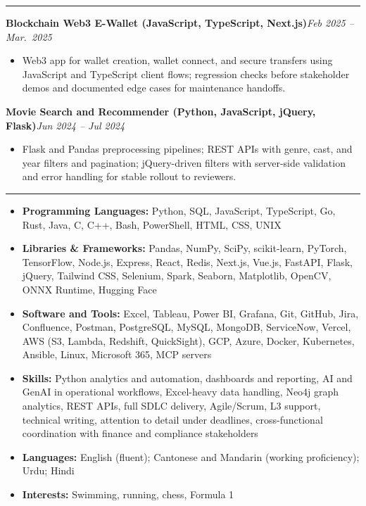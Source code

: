 \documentclass[9pt,a4paper]{article}
\newcommand{\ressection}[1]{%
  \vspace{0.8em}%
  \noindent{\large\scshape\bfseries #1}\par\nobreak
  \vspace{-\parskip}%
  \noindent\rule{\linewidth}{0.1pt}\par\nobreak
  \vspace{-\parskip}%
}
\newcommand{\resumeHeading}[2]{%
  \vspace{0.6em}%
  \noindent\textbf{\small #1}\hfill\textit{\small #2}\par\vspace{0.28em}}
\begin{document}
\ressection{Projects}

\resumeHeading{Blockchain Web3 E-Wallet (JavaScript, TypeScript, Next.js)}{Feb 2025 -- Mar.\ 2025}
\begin{itemize}
  \item Web3 app for wallet creation, wallet connect, and secure transfers using JavaScript and TypeScript client flows; regression checks before stakeholder demos and documented edge cases for maintenance handoffs.
\end{itemize}

\resumeHeading{Movie Search and Recommender (Python, JavaScript, jQuery, Flask)}{Jun 2024 -- Jul 2024}
\begin{itemize}
  \item Flask and Pandas preprocessing pipelines; REST APIs with genre, cast, and year filters and pagination; jQuery-driven filters with server-side validation and error handling for stable rollout to reviewers.
\end{itemize}

\ressection{Skills and Interests}
\begin{itemize}
  \item \textbf{Programming Languages:} Python, SQL, JavaScript, TypeScript, Go, Rust, Java, C, C++, Bash, PowerShell, HTML, CSS, UNIX
  \item \textbf{Libraries \& Frameworks:} Pandas, NumPy, SciPy, scikit-learn, PyTorch, TensorFlow, Node.js, Express, React, Redis, Next.js, Vue.js, FastAPI, Flask, jQuery, Tailwind CSS, Selenium, Spark, Seaborn, Matplotlib, OpenCV, ONNX Runtime, Hugging Face
  \item \textbf{Software and Tools:} Excel, Tableau, Power BI, Grafana, Git, GitHub, Jira, Confluence, Postman, PostgreSQL, MySQL, MongoDB, ServiceNow, Vercel, AWS (S3, Lambda, Redshift, QuickSight), GCP, Azure, Docker, Kubernetes, Ansible, Linux, Microsoft 365, MCP servers
  \item \textbf{Skills:} Python analytics and automation, dashboards and reporting, AI and GenAI in operational workflows, Excel-heavy data handling, Neo4j graph analytics, REST APIs, full SDLC delivery, Agile/Scrum, L3 support, technical writing, attention to detail under deadlines, cross-functional coordination with finance and compliance stakeholders
  \item \textbf{Languages:} English (fluent); Cantonese and Mandarin (working proficiency); Urdu; Hindi
  \item \textbf{Interests:} Swimming, running, chess, Formula 1
\end{itemize}
\end{document}
